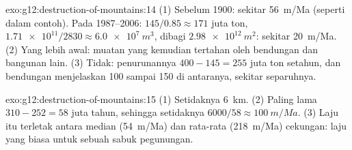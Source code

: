 \begin{solution}{exo:g12:destruction-of-mountains:14}
(1) Sebelum 1900: sekitar \qty{56}{m/Ma} (seperti dalam contoh). Pada
1987--2006: $145/0.85 \approx 171$ juta ton, $\num{1.71e11}/2830
\approx \qty{6.0e7}{m^3}$, dibagi $\qty{2.98e12}{m^2}$: sekitar
\qty{20}{m/Ma}. (2) Yang lebih awal: muatan yang kemudian tertahan oleh
bendungan dan bangunan lain. (3) Tidak: penurunannya $400 - 145 = 255$ juta ton
setahun, dan bendungan menjelaskan 100 sampai 150 di antaranya, sekitar separuhnya.
\end{solution}

\begin{solution}{exo:g12:destruction-of-mountains:15}
(1) Setidaknya \qty{6}{km}. (2) Paling lama $310 - 252 = 58$ juta tahun, sehingga
setidaknya $6000/58 \approx \qty{100}{m/Ma}$. (3) Laju itu terletak antara median
(\qty{54}{m/Ma}) dan rata-rata (\qty{218}{m/Ma}) cekungan: laju yang biasa
untuk sebuah sabuk pegunungan.
\end{solution}

